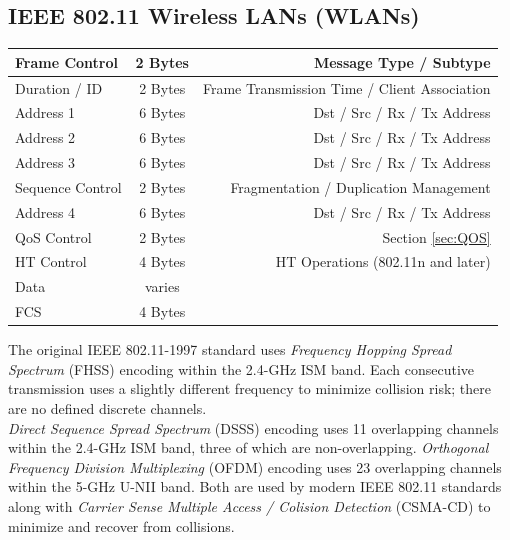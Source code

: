 \documentclass[12pt]{article}
\begin{document}
	\subsection{IEEE 802.11 Wireless LANs (WLANs) \label{subsec:802.11 WLANS}}
	\begin{table}[H]
	\centering
	\begin{tabular}{| l | c | r |}
	\hline
	Frame Control		& 2 Bytes	& Message Type / Subtype\\\hline
	Duration / ID		& 2 Bytes	& Frame Transmission Time / Client Association\\\hline
	Address 1			& 6 Bytes	& Dst / Src / Rx / Tx Address\\\hline
	Address 2			& 6 Bytes	& Dst / Src / Rx / Tx Address\\\hline
	Address 3			& 6 Bytes	& Dst / Src / Rx / Tx Address\\\hline
	Sequence Control		& 2 Bytes	& Fragmentation / Duplication Management\\\hline
	Address 4			& 6 Bytes	& Dst / Src / Rx / Tx Address\\\hline
	QoS Control		& 2 Bytes	& Section \ref{sec:QOS}\\\hline
	HT Control			& 4 Bytes	& HT Operations (802.11n and later)\\\hline
	Data				& varies	&\\\hline
	FCS				& 4 Bytes	&\\\hline
	\end{tabular}\end{table}
	\vspace{8px}
	
	The original IEEE 802.11-1997 standard uses \textit{Frequency Hopping Spread Spectrum} (FHSS) encoding within the 2.4-GHz ISM band. Each consecutive transmission uses a slightly different frequency to minimize collision risk; there are no defined discrete channels.\\
	
	\textit{Direct Sequence Spread Spectrum} (DSSS) encoding uses 11 overlapping channels within the 2.4-GHz ISM band, three of which are non-overlapping. \textit{Orthogonal Frequency Division Multiplexing} (OFDM) encoding uses 23 overlapping channels within the 5-GHz U-NII band. Both are used by modern IEEE 802.11 standards along with \textit{Carrier Sense Multiple Access / Colision Detection} (CSMA-CD) to minimize and recover from collisions.
\end{document}
